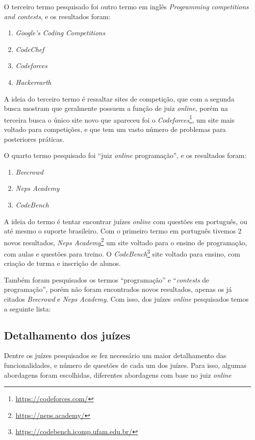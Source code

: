 O terceiro termo pesquisado foi outro termo em inglês \textit{Programming competitions and contests}, e os resultados foram:

\begin{enumerate}
    \item \textit{Google's Coding Competitions}
    \item \textit{CodeChef}
    \item \textit{Codeforces}
    \item \textit{Hackerearth}
\end{enumerate}

A ideia do terceiro termo é ressaltar sites de competição, que com a segunda busca mostram que geralmente possuem a função de juiz \textit{online}, porém na terceira busca o único site novo que apareceu foi o \textit{Codeforces}\footnote{\url{https://codeforces.com/}}, um site mais voltado para competições, e que tem um vasto número de problemas para posteriores práticas.

O quarto termo pesquisado foi ``juiz \textit{online} programação'', e os resultados foram:

\begin{enumerate}
    \item \textit{Beecrowd}
    \item \textit{Neps Academy }
    \item \textit{CodeBench}
\end{enumerate}

A ideia do termo é tentar encontrar juízes \textit{online} com questões em português, ou até mesmo o suporte brasileiro. Com o primeiro termo em português tivemos 2 novos resultados, \textit{Neps Academy}\footnote{\url{https://neps.academy/}} um site voltado para o ensino de programação, com aulas e questões para treino. O \textit{CodeBench}\footnote{\url{https://codebench.icomp.ufam.edu.br/}} site voltado para ensino, com criação de turma e inscrição de alunos.

Também foram pesquisados os termos “programação” e “\textit{contests} de programação”, porém não foram encontrados novos resultados, apenas os já citados \textit{Beecrowd} e \textit{Neps Academy}. Com isso, dos juízes \textit{online} pesquisados temos a seguinte lista:

\subsection{Detalhamento dos juízes}

Dentre os juízes pesquisados se fez necessário um maior detalhamento das funcionalidades, e número de questões de cada um dos juízes. Para isso, algumas abordagens foram escolhidas, diferentes abordagens com base no juiz \textit{online}

